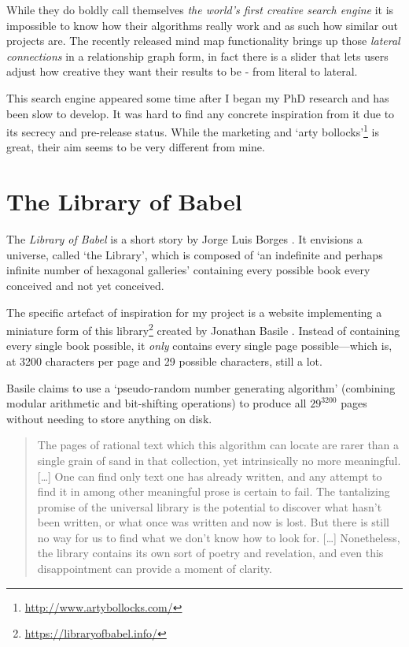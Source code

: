 While they do boldly call themselves \emph{the world's first creative search engine} \autocite{Yossarian2015} it is impossible to know how their algorithms really work and as such how similar out projects are. The recently released mind map functionality brings up those \emph{lateral connections} in a relationship graph form, in fact there is a slider that lets users adjust how creative they want their results to be - from literal to lateral.

This search engine appeared some time after I began my PhD research and has been slow to develop. It was hard to find any concrete inspiration from it due to its secrecy and pre-release status. While the marketing and `arty bollocks'\footnote{\url{http://www.artybollocks.com/}} is great, their aim seems to be very different from mine.


\section{The Library of Babel}
\label{s:babel}

The \emph{Library of Babel} is a short story by Jorge Luis Borges \citeyear{Borges1964}. It envisions a universe, called `the Library', which is composed of `an indefinite and perhaps infinite number of hexagonal galleries' containing every possible book every conceived and not yet conceived.

The specific artefact of inspiration for my project is a website implementing a miniature form of this library\footnote{\url{https://libraryofbabel.info/}} created by Jonathan Basile \citeyear{Basile2015}. Instead of containing every single book possible, it \emph{only} contains every single page possible---which is, at 3200 characters per page and 29 possible characters, still a lot.

Basile claims to use a `pseudo-random number generating algorithm' (combining modular arithmetic and bit-shifting operations) to produce all $29^{3200}$ pages without needing to store anything on disk.

\begin{quotation}
  The pages of rational text which this algorithm can locate are rarer than a single grain of sand in that collection, yet intrinsically no more meaningful.
  [\ldots]
  One can find only text one has already written, and any attempt to find it in among other meaningful prose is certain to fail. The tantalizing promise of the universal library is the potential to discover what hasn’t been written, or what once was written and now is lost. But there is still no way for us to find what we don’t know how to look for.
  [\ldots]
  Nonetheless, the library contains its own sort of poetry and revelation, and even this disappointment can provide a moment of clarity. 
\end{quotation}

